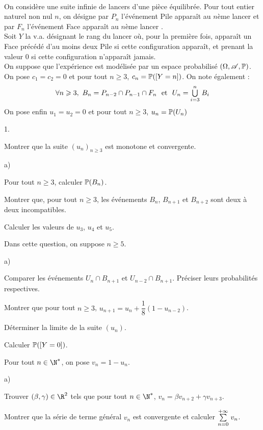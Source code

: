 \documentclass[11pt]{article}%
\begin{document}
\newpage


\begin{exercice}~\\
On considère une suite infinie de lancers d'une pièce équilibrée. Pour 
tout entier naturel non nul $n$, on désigne par $P_n$ l'événement \og 
Pile apparaît au $n$ème lancer \fg{} et par $F_n$ l'événement \og Face 
apparaît au $n$ème lancer \fg{}.\\
Soit $Y$ la v.a. désignant le rang du lancer où, pour la première fois, 
apparaît un Face précédé d'au moins deux Pile si cette configuration 
apparaît, et prenant la valeur $0$ si cette configuration n'apparaît 
jamais.\\
On suppose que l'expérience est modélisée par un espace probabilisé 
$(\Omega, \mathscr{A},\mathbb{P})$.\\
On pose $c_1=c_2=0$ et pour tout $n\geq 3$, $c_n=\mathbb{P}(\left[ {Y=n} \right])$. On 
note également :
\[
\forall n \geq 3, \ B_n=P_{n-2}\cap P_{n-1}\cap F_n \ \mbox{ et } \ 
U_n=\dcup{i=3}{n} B_i
\]
On pose enfin $u_1=u_2=0$ et pour tout $n\geq 3$, $u_n=\mathbb{P}(U_n)$
\begin{noliste}{1.}
\item Montrer que la suite $(u_n)_{n\geq 3}$ est monotone et 
convergente.
\item \begin{noliste}{a)}
	\item Pour tout $n\geq 3$, calculer $\mathbb{P}(B_n)$.
	\item Montrer que, pour tout $n\geq 3$, les événements $B_n$, 
$B_{n+1}$ et $B_{n+2}$ sont deux à deux incompatibles.
	\item Calculer les valeurs de $u_3$, $u_4$ et $u_5$.
	\end{noliste}
\item Dans cette question, on suppose $n\geq 5$.
	\begin{noliste}{a)}
	\item Comparer les événements $U_n \cap B_{n+1}$ et $U_{n-2} 
\cap B_{n+1}$. Préciser leurs probabilités respectives.
	\item Montrer que pour tout $n\geq 3$, $u_{n+1} 
=u_n+\dfrac{1}{8}(1-u_{n-2})$.
	\item Déterminer la limite de la suite $(u_n)$.
	\item Calculer $\mathbb{P}(\left[ {Y=0} \right])$.
	\end{noliste}
\item Pour tout $n\in \N^*$, on pose $v_n=1-u_n$.
\begin{noliste}{a)}
\item Trouver $(\beta,\gamma)\in\R^2$ tels que pour tout $n\in\N^*$, 
$v_n=\beta v_{n+2} +\gamma v_{n+3}$.
\item Montrer que la série de terme général $v_n$ est convergente et 
calculer ${\textstyle\sum\limits_{n=0}^{+\infty}}\hspace{.1cm} v_n$.
\end{noliste}
\end{noliste}
\end{exercice}
\end{document}
